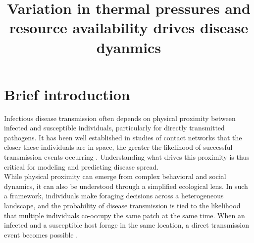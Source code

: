 
\title{Variation in thermal pressures and resource availability drives disease dyanmics}

\author[1]{
  
}
\date{}

\maketitle



\begin{corrauthor}
\end{corrauthor}

\section*{Brief introduction}\label{s:introduction}

Infectious disease transmission often depends on physical proximity between infected and susceptible individuals, particularly for directly transmitted pathogens. It has been well established in studies of contact networks that the closer these individuals are in space, the greater the likelihood of successful transmission events occurring \citep{proffittElkDistributionSpatial2011}. Understanding what drives this proximity is thus critical for modeling and predicting disease spread. \\

While physical proximity can emerge from complex behavioral and social dynamics, it can also be understood through a simplified ecological lens. In such a framework, individuals make foraging decisions across a heterogeneous landscape, and the probability of disease transmission is tied to the likelihood that multiple individuals co-occupy the same patch at the same time. When an infected and a susceptible host forage in the same location, a direct transmission event becomes possible \citep{whiteUsingContactNetworks2017}. \\

